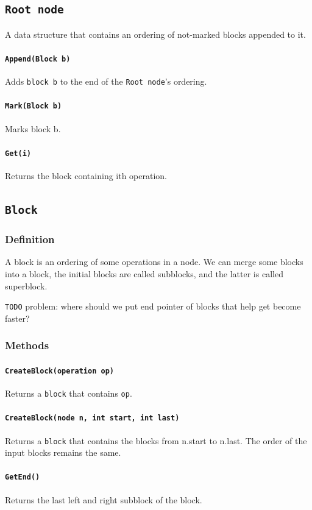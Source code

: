 \documentclass[12pt]{article}
\begin{document}
\subsection{\texttt{Root node}}
A data structure that contains an ordering of not-marked blocks appended to it.
\paragraph{\texttt{Append(Block b)}}
Adds \texttt{block b} to the end of the \texttt{Root node}'s ordering.
\paragraph{\texttt{Mark(Block b)}}
Marks block b.
\paragraph{\texttt{Get(i)}}
Returns the block containing ith operation.



\subsection{\texttt{Block}}
\subsubsection{Definition}
A block is an ordering of some operations in a node. We can merge some blocks into a block, the initial blocks are called subblocks, and the latter is called superblock.

\texttt{TODO} {problem: where should we put end pointer of blocks that help get become faster?}
\subsubsection{Methods}
\paragraph{\texttt{CreateBlock(operation op)}}
Returns a \texttt{block} that contains \texttt{op}.
\paragraph{\texttt{CreateBlock(node n, int start, int last)}}
Returns a \texttt{block} that contains the blocks from n.start to n.last. The order of the input blocks remains the same.
\paragraph{\texttt{GetEnd()}}
Returns the last left and right subblock of the block.
\end{document}
